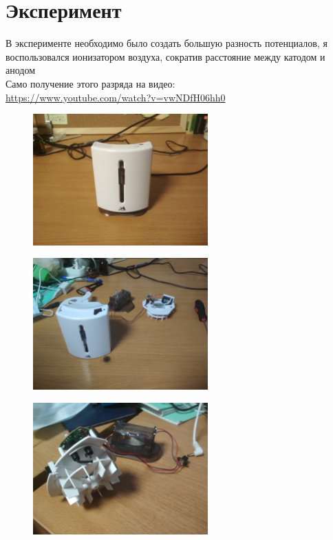 \documentclass[a4paper, 12pt]{article}
\begin{document}
\section{Эксперимент}
В эксперименте необходимо было создать большую разность потенциалов, я воспользовался ионизатором воздуха, сократив расстояние между катодом и анодом\\
Само получение этого разряда на видео:\\ \href{https://www.youtube.com/watch?v=vwNDfH06hh0}{https://www.youtube.com/watch?v=vwNDfH06hh0}
\begin{figure}[H]
	\includegraphics[width = 0.6\textwidth]{1.jpg}
\end{figure}
\begin{figure}[H]
	\includegraphics[width = 0.6\textwidth]{2.jpg}
\end{figure}
\begin{figure}[H]
	\includegraphics[width = 0.6\textwidth]{3.jpg}
\end{figure}
\end{document}
